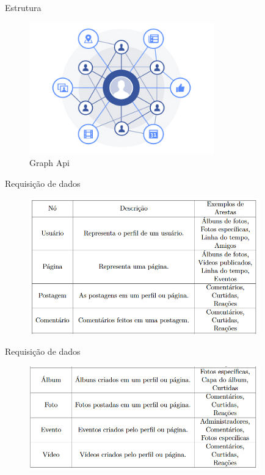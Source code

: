 \documentclass{aula-ifb}
\begin{document}
\begin{frame}{Estrutura}
	\begin{figure}[h]
		\includegraphics[width=8cm]{figuras/facebookgraph.png}
		\caption{Graph Api \cite{figura3}}
		\label{fig:facebookgraph}
	\end{figure}
\end{frame}

\begin{frame}{Requisição de dados}
\begin{figure}[h]
\includegraphics[width=10cm]{figuras/nosarestas.png}
\label{fig:facebookgraph}
\end{figure}
\end{frame}

\begin{frame}{Requisição de dados}
\begin{figure}[h]
\includegraphics[width=10cm]{figuras/nosarestas2.png}
\label{fig:facebookgraph}
\end{figure}
\end{frame}
\end{document}
